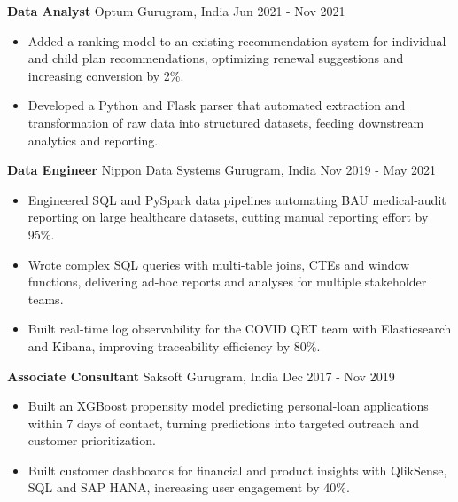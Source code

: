 \documentclass[10pt,a4paper]{article}
\newcommand{\role}[4]{\textbf{#1} \textbar{} #2 \hfill #3 \textbar{} #4\par}
\begin{document}
\vspace{3pt}
\role{Data Analyst}{Optum}{Gurugram, India}{Jun 2021 - Nov 2021}
\begin{itemize}
  \item Added a ranking model to an existing recommendation system for individual and child plan recommendations, optimizing renewal suggestions and increasing conversion by 2\%.
  \item Developed a Python and Flask parser that automated extraction and transformation of raw data into structured datasets, feeding downstream analytics and reporting.
\end{itemize}
\vspace{3pt}
\role{Data Engineer}{Nippon Data Systems}{Gurugram, India}{Nov 2019 - May 2021}
\begin{itemize}
  \item Engineered SQL and PySpark data pipelines automating BAU medical-audit reporting on large healthcare datasets, cutting manual reporting effort by 95\%.
  \item Wrote complex SQL queries with multi-table joins, CTEs and window functions, delivering ad-hoc reports and analyses for multiple stakeholder teams.
  \item Built real-time log observability for the COVID QRT team with Elasticsearch and Kibana, improving traceability efficiency by 80\%.
\end{itemize}
\vspace{3pt}
\role{Associate Consultant}{Saksoft}{Gurugram, India}{Dec 2017 - Nov 2019}
\begin{itemize}
  \item Built an XGBoost propensity model predicting personal-loan applications within 7 days of contact, turning predictions into targeted outreach and customer prioritization.
  \item Built customer dashboards for financial and product insights with QlikSense, SQL and SAP HANA, increasing user engagement by 40\%.
\end{itemize}
\end{document}
